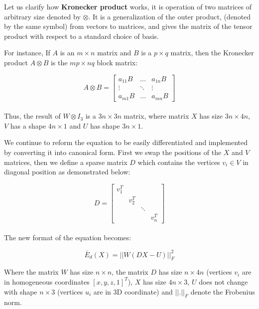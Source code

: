 \documentclass[../structure.tex]{subfiles}
\begin{document}
Let us clarify how \textbf{Kronecker product} works, it is operation of two matrices of arbitrary size denoted by $\otimes$. It is a generalization of the outer product, (denoted by the same symbol) from vectors to matrices, and gives the matrix of the tensor product with respect to a standard choice of basis.

For instance, If $A$ is an $m \times n$ matrix and $B$ is a $p \times q$ matrix, then the Kronecker product $A \otimes B$ is the $mp \times nq$ block matrix:

\begin{equation*}
A \otimes B =
\begin{bmatrix}
a_{11}B & \dots  & a_{1n}B \\
\vdots  & \ddots & \vdots  \\
a_{m1}B & \dots  & a_{mn}B
\end{bmatrix}
\end{equation*}\\

Thus, the result of $W \otimes I_{3}$ is a $3n\times 3n$ matrix, where matrix $X$ has size $3n\times4n$, $V$ has a shape $4n\times1$ and $U$ has shape $3n\times1$.

We continue to reform the equation to be easily differentiated and implemented by converting it into canonical form. First we swap the positions of the $X$ and $V$ matrices, then we define a sparse matrix $D$ which contains the vertices $v_{i} \in V$ in diagonal position as demonstrated below:

\begin{equation}
D =
\begin{bmatrix}
v_{1}^T & & & \\
& v_{2}^T & & \\
& & \ddots & \\
& & & v_{n}^T
\end{bmatrix}
\label{equ:matD}
\end{equation}\\

The new format of the equation becomes:

\begin{equation}
\bar{E}_{d}(X) = ||W(DX-U)||_{F}^2
\label{equ:distance4}
\end{equation}

\hspace{2em}Where the matrix $W$ has size $n\times n$, the matrix $D$ has size $n\times 4n$ (vertices $v_{i}$ are in homogeneous coordinates $[x,y,z,1]^T$), $X$ has size $4n\times 3$, $U$ does not change with shape $n\times 3$ (vertices $u_{i}$ are in 3D coordinate) and $||.||_{F}$ denote the Frobenius norm.
\end{document}
